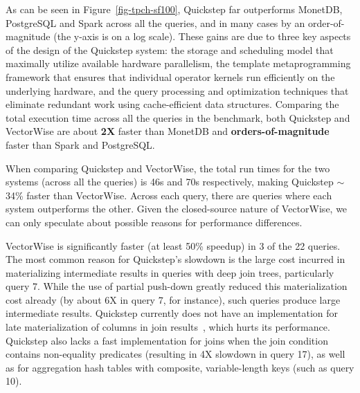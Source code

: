 As can be seen in Figure~\ref{fig-tpch-sf100}, Quickstep far outperforms MonetDB, PostgreSQL and Spark across all the queries, and in many cases by an order-of-magnitude (the y-axis is on a log scale). These gains are due to three key aspects of the design of the Quickstep system: the storage and scheduling model that maximally utilize available hardware parallelism, the template metaprogramming framework that ensures that individual operator kernels run efficiently on the underlying hardware, and the query processing and optimization techniques that eliminate redundant work using cache-efficient data structures. Comparing the total execution time across all the queries in the benchmark, both Quickstep and VectorWise are about \textbf{2X} faster than MonetDB and \textbf{orders-of-magnitude} faster than Spark and PostgreSQL.

When comparing Quickstep and VectorWise, the total run times for the two systems (across all the queries) is 46s and 70s respectively, making Quickstep $\sim$34\% faster than VectorWise. Across each query, there are queries where each system outperforms the other. Given the closed-source nature of VectorWise, we can only speculate about possible reasons for performance differences.

VectorWise is significantly faster (at least 50\% speedup) in 3 of the 22 queries. The most common reason for Quickstep's slowdown is the large cost incurred in materializing intermediate results in queries with deep join trees, particularly query 7. While the use of partial push-down greatly reduced this materialization cost already (by about 6X in query 7, for instance), such queries produce large intermediate results. Quickstep currently does not have an implementation for late materialization of columns in join results~\cite{Shrinivas2013Materialization}, which hurts its performance. Quickstep also lacks a fast implementation for joins when the join condition contains non-equality predicates (resulting in 4X slowdown in query 17), as well as for aggregation hash tables with composite, variable-length keys (such as query 10).

